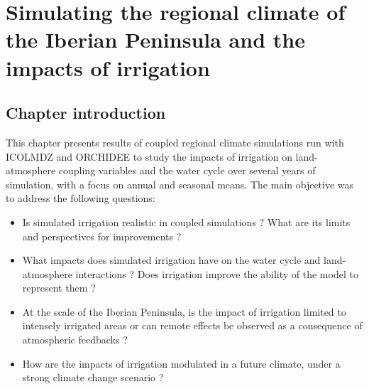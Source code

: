 \chapter{Simulating the regional climate of the Iberian Peninsula and the impacts of irrigation}
\label{chap:monthly}
\minitoc
\clearpage

\section{Chapter introduction}

This chapter presents results of coupled regional climate simulations run with ICOLMDZ and ORCHIDEE to study the impacts of irrigation on land-atmosphere coupling variables and the water cycle over several years of simulation, with a focus on annual and seasonal means. The main objective was to address the following questions:
\begin{itemize}
    \item Is simulated irrigation realistic in coupled simulations ? What are its limits and perspectives for improvements ?
    \item What impacts does simulated irrigation have on the water cycle and land-atmosphere interactions ? Does irrigation improve the ability of the model to represent them ?
    \item At the scale of the Iberian Peninsula, is the impact of irrigation limited to intensely irrigated areas or can remote effects be observed as a consequence of atmospheric feedbacks ?
    \item How are the impacts of irrigation modulated in a future climate, under a strong climate change scenario ?
\end{itemize}

